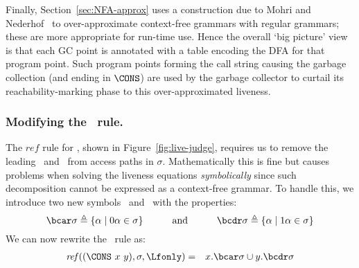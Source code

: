 Finally,  Section~\ref{sec:NFA-approx}
uses a construction due to
Mohri and Nederhof~\cite{mohri00regular} to over-approximate
context-free grammars with regular grammars;
these are more appropriate for run-time use.
%
Hence the overall `big picture' view is that each GC point
is annotated with a table encoding the DFA for that program point.
Such program points forming the call string causing the garbage collection
(and ending in $\CONS$)
are used by the garbage collector to curtail its reachability-marking phase
to this over-approximated liveness.


\subsubsection{Modifying the \CONS\ rule.}

The    $\mathit{ref}$    rule for \CONS,    shown    in
Figure~\ref{fig:live-judge},  requires  us  to remove  the  leading
\acar\  and  \acdr\  from  access paths in  $\sigma$.
  Mathematically  this  is fine  but causes problems  when
  solving  the liveness equations  {\em symbolically}  since such
  decomposition cannot be expressed as a context-free grammar.  
To  handle this,  we introduce  two  new symbols  \bcar\  and
\bcdr\ with the properties:
\[
 \bcar\sigma \triangleq \{\alpha \mid 0\alpha \in \sigma\}
\hspace{3em} \mbox{and} \hspace{3em}
 \bcdr\sigma \triangleq \{\alpha \mid 1\alpha \in \sigma\}
\]
We can now rewrite the \CONS\ rule as:
\begin{eqnarray*}
\mathit{ref\/}((\CONS~x~y),\sigma,\Lfonly)
&=& x.\bcar\sigma \cup y.\bcdr\sigma  \label{eqn:mod-cons}
\end{eqnarray*}

